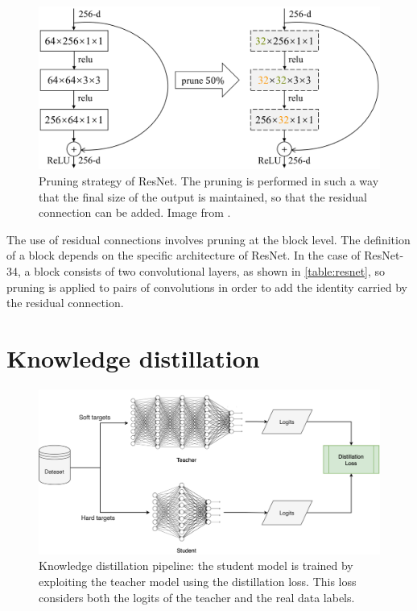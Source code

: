 \begin{figure}[H]
    \begin{center}
        \includegraphics[width=\columnwidth]{images/resnet-pruning.png}
    \end{center}
    \caption{Pruning strategy of ResNet. The pruning is performed in such a way that the final size of the output is maintained, so that the residual connection can be added. Image from \cite{8416559}.}
    \label{fig:pruning-resnet}
\end{figure}

The use of residual connections involves pruning at the block level.
The definition of a block depends on the specific  architecture of ResNet. In the case of ResNet-34, a block consists of two convolutional layers, as shown in \autoref{table:resnet}, so pruning is applied to pairs of convolutions in order to add the identity carried by the residual connection.

\section{Knowledge distillation}
\label{sec:method-kd}

\begin{figure}[H]%
	\centering

    \begin{center}
        \includegraphics[width=\columnwidth]{images/kd.drawio.png}
    \end{center}

	\caption{Knowledge distillation pipeline: the student model is trained by exploiting the teacher model using the distillation loss. This loss considers both the logits of the teacher and the real data labels.}%
	\label{fig:kd}%
\end{figure}

